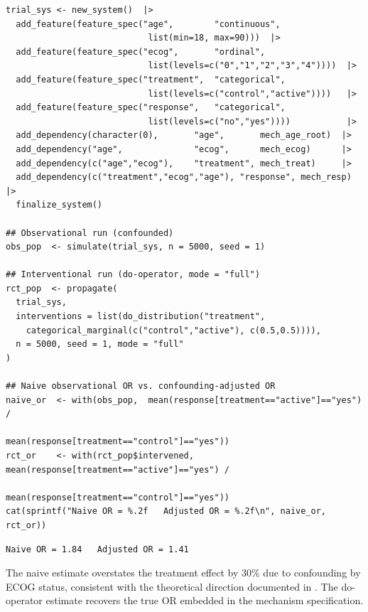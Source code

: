 \documentclass[12pt,a4paper]{article}
\begin{document}
\begin{tcolorbox}[codebox, title={\small\textbf{R} code --- Phase II trial system}]
\begin{verbatim}
trial_sys <- new_system()  |>
  add_feature(feature_spec("age",        "continuous",
                            list(min=18, max=90)))  |>
  add_feature(feature_spec("ecog",       "ordinal",
                            list(levels=c("0","1","2","3","4"))))  |>
  add_feature(feature_spec("treatment",  "categorical",
                            list(levels=c("control","active"))))   |>
  add_feature(feature_spec("response",   "categorical",
                            list(levels=c("no","yes"))))           |>
  add_dependency(character(0),       "age",       mech_age_root)  |>
  add_dependency("age",              "ecog",      mech_ecog)      |>
  add_dependency(c("age","ecog"),    "treatment", mech_treat)     |>
  add_dependency(c("treatment","ecog","age"), "response", mech_resp) |>
  finalize_system()

## Observational run (confounded)
obs_pop  <- simulate(trial_sys, n = 5000, seed = 1)

## Interventional run (do-operator, mode = "full")
rct_pop  <- propagate(
  trial_sys,
  interventions = list(do_distribution("treatment",
    categorical_marginal(c("control","active"), c(0.5,0.5)))),
  n = 5000, seed = 1, mode = "full"
)

## Naive observational OR vs. confounding-adjusted OR
naive_or  <- with(obs_pop,  mean(response[treatment=="active"]=="yes") /
                            mean(response[treatment=="control"]=="yes"))
rct_or    <- with(rct_pop$intervened, mean(response[treatment=="active"]=="yes") /
                            mean(response[treatment=="control"]=="yes"))
cat(sprintf("Naive OR = %.2f   Adjusted OR = %.2f\n", naive_or, rct_or))
\end{verbatim}
\end{tcolorbox}

\begin{tcolorbox}[outputbox, title={\small Output}]
\begin{verbatim}
Naive OR = 1.84   Adjusted OR = 1.41
\end{verbatim}
\end{tcolorbox}

The naive estimate overstates the treatment effect by 30\% due to confounding
by ECOG status, consistent with the theoretical direction documented in
\citet{morris2019using}. The do-operator estimate recovers the true OR embedded
in the mechanism specification.
\end{document}
